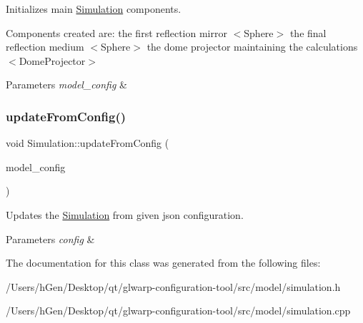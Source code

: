 Initializes main \mbox{\hyperlink{class_simulation}{Simulation}} components. 

Components created are\+: the first reflection mirror $<$\+Sphere$>$ the final reflection medium $<$\+Sphere$>$ the dome projector maintaining the calculations $<$\+Dome\+Projector$>$


\begin{DoxyParams}{Parameters}
{\em model\+\_\+config} & \\
\hline
\end{DoxyParams}
\mbox{\label{class_simulation_a0a19a19f99d3e88f020c8e1a4b7d8440}} 
\subsubsection{\texorpdfstring{update\+From\+Config()}{updateFromConfig()}}
{\footnotesize\ttfamily void Simulation\+::update\+From\+Config (\begin{DoxyParamCaption}\item[{\mbox{\hyperlink{struct_model_config}{Model\+Config}} $\ast$}]{model\+\_\+config }\end{DoxyParamCaption})}



Updates the \mbox{\hyperlink{class_simulation}{Simulation}} from given json configuration. 


\begin{DoxyParams}{Parameters}
{\em config} & \\
\hline
\end{DoxyParams}


The documentation for this class was generated from the following files\+:\begin{DoxyCompactItemize}
\item 
/\+Users/h\+Gen/\+Desktop/qt/glwarp-\/configuration-\/tool/src/model/simulation.\+h\item 
/\+Users/h\+Gen/\+Desktop/qt/glwarp-\/configuration-\/tool/src/model/simulation.\+cpp\end{DoxyCompactItemize}
